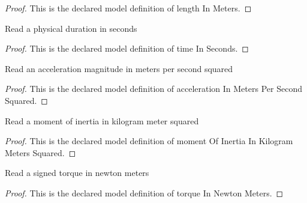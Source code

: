 \begin{proof}
  This is the declared model definition of length In Meters.
\end{proof}
\begin{definition}
  \label{def:physics:phyx-mini-0270:phyxminiproblems-problemphyxmini0270-timeinseconds}
  Read a physical duration in seconds
\end{definition}
\begin{proof}
  This is the declared model definition of time In Seconds.
\end{proof}
\begin{definition}
  \label{def:physics:phyx-mini-0270:phyxminiproblems-problemphyxmini0270-accelerationinmeterspersecondsquared}
  Read an acceleration magnitude in meters per second squared
\end{definition}
\begin{proof}
  This is the declared model definition of acceleration In Meters Per Second Squared.
\end{proof}
\begin{definition}
  \label{def:physics:phyx-mini-0270:phyxminiproblems-problemphyxmini0270-momentofinertiainkilogrammeterssquared}
  Read a moment of inertia in kilogram meter squared
\end{definition}
\begin{proof}
  This is the declared model definition of moment Of Inertia In Kilogram Meters Squared.
\end{proof}
\begin{definition}
  \label{def:physics:phyx-mini-0270:phyxminiproblems-problemphyxmini0270-torqueinnewtonmeters}
  Read a signed torque in newton meters
\end{definition}
\begin{proof}
  This is the declared model definition of torque In Newton Meters.
\end{proof}

